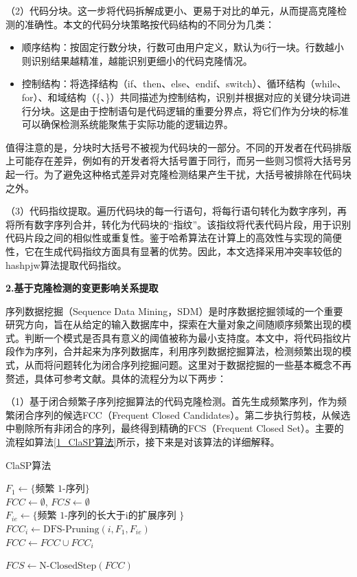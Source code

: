 （2）代码分块。这一步将代码拆解成更小、更易于对比的单元，从而提高克隆检测的准确性。本文的代码分块策略按代码结构的不同分为几类：

\begin{itemize}
    \item 顺序结构：按固定行数分块，行数可由用户定义，默认为6行一块。行数越小则识别结果越精准，越能识别更细小的代码克隆情况。
    
    \item 控制结构：将选择结构（if、then、else、endif、switch）、循环结构（while、for）、和域结构（\{、\}）共同描述为控制结构，识别并根据对应的关键分块词进行分块。这是由于控制语句是代码逻辑的重要分界点，将它们作为分块的标准可以确保检测系统能聚焦于实际功能的逻辑边界。
\end{itemize}

值得注意的是，分块时大括号不被视为代码块的一部分。不同的开发者在代码排版上可能存在差异，例如有的开发者将大括号置于同行，而另一些则习惯将大括号另起一行。为了避免这种格式差异对克隆检测结果产生干扰，大括号被排除在代码块之外。

（3）代码指纹提取。遍历代码块的每一行语句，将每行语句转化为数字序列，再将所有数字序列合并，转化为代码块的“指纹”。该指纹将代表代码片段，用于识别代码片段之间的相似性或重复性。鉴于哈希算法在计算上的高效性与实现的简便性，它在生成代码指纹方面具有显著的优势。因此，本文选择采用冲突率较低的hashpjw算法提取代码指纹。

\noindent \textbf{2.基于克隆检测的变更影响关系提取}

序列数据挖掘（Sequence Data Mining，SDM）是时序数据挖掘领域的一个重要研究方向，旨在从给定的输入数据库中，探索在大量对象之间随顺序频繁出现的模式。判断一个模式是否具有意义的阈值被称为最小支持度。本文中，将代码指纹片段作为序列，合并起来为序列数据库，利用序列数据挖掘算法，检测频繁出现的模式，从而将问题转化为闭合序列挖掘问题。这里对于数据挖掘的一些基本概念不再赘述，具体可参考文献\cite{2013ClaSP}。具体的流程分为以下两步：

（1）基于闭合频繁子序列挖掘算法的代码克隆检测。首先生成频繁序列，作为频繁闭合序列的候选FCC（Frequent Closed Candidates）。第二步执行剪枝，从候选中剔除所有非闭合的序列，最终得到精确的FCS（Frequent Closed Set）。主要的流程如算法\ref{1_ClaSP算法}所示，接下来是对该算法的详细解释。

\begin{algorithm}
\caption{ClaSP算法}
\label{1_ClaSP算法}
 $F_1 \gets \{\text{频繁 1-序列}\}$ \\
 $FCC \gets \emptyset$, $FCS \gets \emptyset$  \\
{
    $F_{ie} \gets \{\text{频繁 1-序列的长大于i的扩展序列 } \}$ \\
    $FCC_i \gets \text{DFS-Pruning}(i, F_1, F_{ie})$ \\
    $FCC \gets FCC \cup FCC_i$
}

 $FCS \gets \text{N-ClosedStep}(FCC)$
\end{algorithm}


